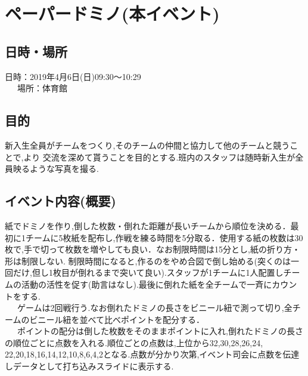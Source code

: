 \documentclass[a4j]{jarticle}
\begin{document}
\section{ペーパードミノ(本イベント)}
\subsection{日時・場所}
日時：2019年4月6日(日)09:30〜10:29\\
\ \ \ 場所：体育館\\
\subsection{目的}
新入生全員がチームをつくり,そのチームの仲間と協力して他のチームと競うことで,より
交流を深めて貰うことを目的とする.班内のスタッフは随時新入生が全員映るような写真を撮る.
\subsection{イベント内容(概要)}
紙でドミノを作り,倒した枚数・倒れた距離が長いチームから順位を決める．最初に1チームに5枚紙を配布し,作戦を練る時間を5分取る．使用する紙の枚数は30枚で,手で切って枚数を増やしても良い．なお制限時間は15分とし,紙の折り方・形は制限しない.
制限時間になると,作るのをやめ合図で倒し始める(突くのは一回だけ,但し1枚目が倒れるまで突いて良い).スタッフが1チームに1人配置しチームの活動の活性を促す(助言はなし).最後に倒れた紙を全チームで一斉にカウントをする.\\
\ \ \ ゲームは2回戦行う.なお倒れたドミノの長さをビニール紐で測って切り,全チームのビニール紐を並べて比べポイントを配分する．\\
\ \ \ ポイントの配分は倒した枚数をそのままポイントに入れ,倒れたドミノの長さの順位ごとに点数を入れる.順位ごとの点数は,上位から32,30,28,26,24,
22,20,18,16,14,12,10,8,6,4,2となる.点数が分かり次第,イベント司会に点数を伝達しデータとして打ち込みスライドに表示する.
\end{document}
